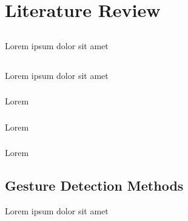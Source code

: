 \chapter{Literature Review} \label{chap:sota}


\section*{}
\begin{dummied}
    Lorem ipsum dolor sit amet
\end{dummied}

\section{} \label{sec:sota_}
\begin{dummied}
    Lorem ipsum dolor sit amet
\end{dummied}
\subsection{}
\begin{dummied}
    Lorem
\end{dummied}
\subsection{}
\begin{dummied}
    Lorem
\end{dummied}
\subsection{}
\begin{dummied}
    Lorem
\end{dummied}



\section{Gesture Detection Methods} \label{sec:sota_}
\begin{dummied}
    Lorem ipsum dolor sit amet
\end{dummied}

